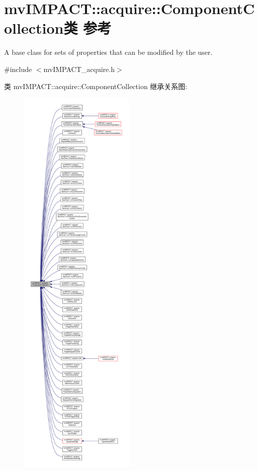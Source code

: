 \hypertarget{classmv_i_m_p_a_c_t_1_1acquire_1_1_component_collection}{\section{mv\+I\+M\+P\+A\+C\+T\+:\+:acquire\+:\+:Component\+Collection类 参考}
\label{classmv_i_m_p_a_c_t_1_1acquire_1_1_component_collection}
}


A base class for sets of properties that can be modified by the user.  




{\ttfamily \#include $<$mv\+I\+M\+P\+A\+C\+T\+\_\+acquire.\+h$>$}



类 mv\+I\+M\+P\+A\+C\+T\+:\+:acquire\+:\+:Component\+Collection 继承关系图\+:
\nopagebreak
\begin{figure}[H]
\begin{center}
\leavevmode
\includegraphics[height=550pt]{classmv_i_m_p_a_c_t_1_1acquire_1_1_component_collection__inherit__graph}
\end{center}
\end{figure}
